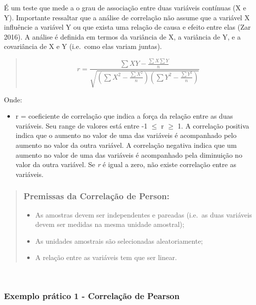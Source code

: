 \documentclass[
]{book}
\providecommand{\tightlist}{%
  \setlength{\itemsep}{0pt}\setlength{\parskip}{0pt}}
\begin{document}
É um teste que mede a o grau de associação entre duas variáveis contínuas (X e Y). Importante ressaltar que a análise de correlação não assume que a variável X influêncie a variável Y ou que exista uma relação de causa e efeito entre elas (Zar 2016). A análise é definida em termos da variância de X, a variância de Y, e a covariância de X e Y (i.e.~como elas variam juntas).

\begin{quote}
\[ r = \frac{\sum{XY} - \frac{\sum{X} \sum{Y}}{n}}{\sqrt{\left(\sum{X^2} - \frac{\sum{X}^2}{n}\right)\left(\sum{Y^2} - \frac{\sum{Y}^2}{n}\right)}} \]
\end{quote}

Onde:

\begin{itemize}
\tightlist
\item
  r = coeficiente de correlação que indica a força da relação entre as duas variáveis. Seu range de valores está entre -1 \(\leq\) r \(\geq\) 1. A correlação positiva indica que o aumento no valor de uma das variáveis é acompanhado pelo aumento no valor da outra variável. A correlação negativa indica que um aumento no valor de uma das variáveis é acompanhado pela diminuição no valor da outra variável. Se \emph{r} é igual a zero, não existe correlação entre as variáveis.
\end{itemize}

\begin{quote}
\hypertarget{premissas-da-correlauxe7uxe3o-de-person}{%
\subsubsection{Premissas da Correlação de Person:}\label{premissas-da-correlauxe7uxe3o-de-person}}

\begin{itemize}
\tightlist
\item
  As amostras devem ser independentes e pareadas (i.e.~as duas variáveis devem ser medidas na mesma unidade amostral);
\item
  As unidades amostrais são selecionadas aleatoriamente;
\item
  A relação entre as variáveis tem que ser linear.
\end{itemize}
\end{quote}

~

\hypertarget{exemplo-pruxe1tico-1---correlauxe7uxe3o-de-pearson}{%
\subsubsection{Exemplo prático 1 - Correlação de Pearson}\label{exemplo-pruxe1tico-1---correlauxe7uxe3o-de-pearson}}
\end{document}
